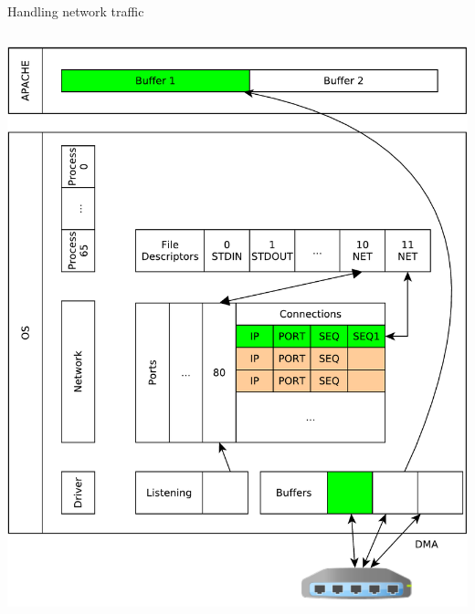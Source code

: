 \documentclass{beamer}
\begin{document}
\begin{frame}[fragile]{Handling network traffic}
\begin{columns}
\begin{column}[t]{0.5\textwidth}
\begin{center}
{  \includegraphics[width=1\linewidth]{sock_mem_12}
     }
\end{center}
\end{column}
\end{columns}
\end{frame}
\end{document}
